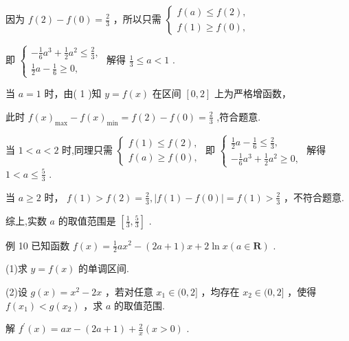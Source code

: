 \documentclass[10pt]{article}
\begin{document}
因为 \(f\left( 2\right)  - f\left( 0\right)  = \frac{2}{3}\) ，所以只需 \(\left\{  \begin{array}{l} f\left( a\right)  \leq  f\left( 2\right) , \\  f\left( 1\right)  \geq  f\left( 0\right) , \end{array}\right.\)

即 \(\left\{  \begin{array}{l}  - \frac{1}{6}{a}^{3} + \frac{1}{2}{a}^{2} \leq  \frac{2}{3}, \\  \frac{1}{2}a - \frac{1}{6} \geq  0, \end{array}\right.\) 解得 \(\frac{1}{3} \leq  a < 1\) .

当 \(a = 1\) 时，由( 1 )知 \(y = f\left( x\right)\) 在区间 \(\left\lbrack  {0,2}\right\rbrack\) 上为严格增函数，

此时 \(f{\left( x\right) }_{\max } - f{\left( x\right) }_{\min } = f\left( 2\right)  - f\left( 0\right)  = \frac{2}{3}\) ,符合题意.

当 \(1 < a < 2\) 时,同理只需 \(\left\{  \begin{array}{l} f\left( 1\right)  \leq  f\left( 2\right) , \\  f\left( a\right)  \geq  f\left( 0\right) , \end{array}\right.\) 即 \(\left\{  \begin{array}{l} \frac{1}{2}a - \frac{1}{6} \leq  \frac{2}{3}, \\   - \frac{1}{6}{a}^{3} + \frac{1}{2}{a}^{2} \geq  0, \end{array}\right.\) 解得 \(1 < a \leq  \frac{5}{3}\) .

当 \(a \geq  2\) 时， \(f\left( 1\right)  > f\left( 2\right)  = \frac{2}{3},\left| {f\left( 1\right)  - f\left( 0\right) }\right|  = f\left( 1\right)  > \frac{2}{3}\) ，不符合题意.

综上,实数 \(a\) 的取值范围是 \(\left\lbrack  {\frac{1}{3},\frac{5}{3}}\right\rbrack\) .

例 10 已知函数 \(f\left( x\right)  = \frac{1}{2}a{x}^{2} - \left( {{2a} + 1}\right) x + 2\ln x\left( {a \in  \mathbf{R}}\right)\) .

(1)求 \(y = f\left( x\right)\) 的单调区间.

(2)设 \(g\left( x\right)  = {x}^{2} - {2x}\) ，若对任意 \({x}_{1} \in  (0,2\rbrack\) ，均存在 \({x}_{2} \in  (0,2\rbrack\) ，使得 \(f\left( {x}_{1}\right)  < g\left( {x}_{2}\right)\) ，求 \(a\) 的取值范围.

解 \({f}^{\prime }\left( x\right)  = {ax} - \left( {{2a} + 1}\right)  + \frac{2}{x}\left( {x > 0}\right)\) .
\end{document}
